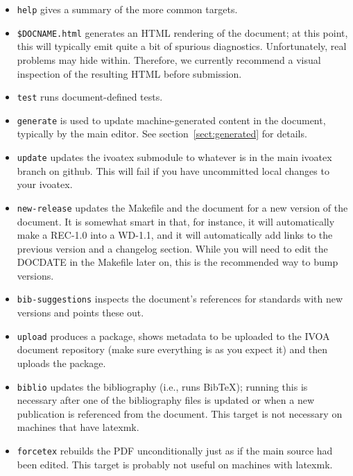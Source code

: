 \documentclass[11pt,a4paper]{ivoa}
\newcommand{\BibTeX}{Bib\TeX}
\begin{document}
\begin{itemize}
\item \texttt{help} gives a summary of the more common targets.

\item \texttt{\$DOCNAME.html} generates an HTML rendering of the
document; at this point, this will typically emit quite a bit of
spurious diagnostics.  Unfortunately, real problems may hide within.
Therefore, we currently recommend a visual inspection of the resulting
HTML before submission.

\item \texttt{test} runs document-defined tests.

\item \texttt{generate} is used to update machine-generated content in
the document, typically by the main editor.  See
section~\ref{sect:generated} for details.

\item \texttt{update} updates the ivoatex submodule to whatever is in
the main ivoatex branch on github.  This will fail if you have
uncommitted local changes to your ivoatex.

\item \texttt{new-release} updates the Makefile and the document for a
new version of the document.  It is somewhat smart in that, for
instance, it will automatically make a REC-1.0 into a WD-1.1, and it
will automatically add links to the previous version and a changelog
section.  While you will need to edit the DOCDATE in the Makefile later on, this
is the recommended way to bump versions.

\item \texttt{bib-suggestions} inspects the document's references for
standards with new versions and points these out.

\item \texttt{upload} produces a package, shows metadata to be uploaded to the
IVOA document repository (make sure everything is as you expect it) and
then uploads the package.

\item \texttt{biblio} updates the bibliography (i.e., runs \BibTeX);
running this is necessary after one of the bibliography files is updated
or when a new publication is referenced from the document.  This target
is not necessary on machines that have latexmk.

\item \texttt{forcetex} rebuilds the PDF unconditionally just as if the
main source had been edited.  This target is probably not useful on
machines with latexmk.


\end{itemize}
\end{document}
